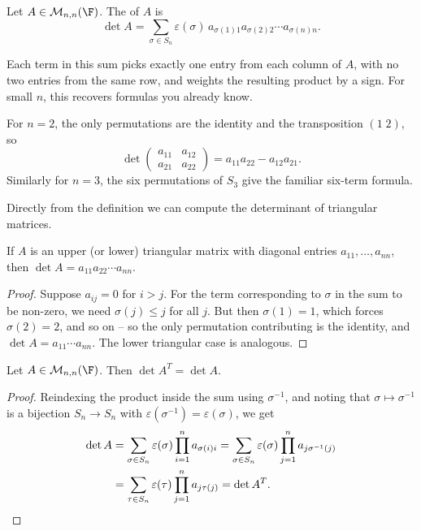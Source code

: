 \begin{definition}[Determinant]
    Let $A \in \mathcal{M}_{n,n}(\F)$. The  of $A$ is
    $$
    \det A = \sum_{\sigma \in S_n} \varepsilon(\sigma)\, a_{\sigma(1) 1} a_{\sigma(2) 2} \cdots a_{\sigma(n) n}.
    $$
\end{definition}

Each term in this sum picks exactly one entry from each column of $A$, with no two entries from the same row, and weights the resulting product by a sign. For small $n$, this recovers formulas you already know.

\begin{example}
    For $n = 2$, the only permutations are the identity and the transposition $(1\;2)$, so
    $$
    \det \begin{pmatrix}
        a_{11} & a_{12} \\ a_{21} & a_{22}
    \end{pmatrix} = a_{11}a_{22} - a_{12}a_{21}.
    $$
    Similarly for $n = 3$, the six permutations of $S_3$ give the familiar six-term formula.
\end{example}

Directly from the definition we can compute the determinant of triangular matrices.

\begin{lemma}
    If $A$ is an upper (or lower) triangular matrix with diagonal entries $a_{11}, \dots, a_{nn}$, then $\det A = a_{11} a_{22} \cdots a_{nn}$.
\end{lemma}
\begin{proof}
    Suppose $a_{ij} = 0$ for $i > j$. For the term corresponding to $\sigma$ in the sum to be non-zero, we need $\sigma(j) \leq j$ for all $j$. But then $\sigma(1) = 1$, which forces $\sigma(2) = 2$, and so on -- so the only permutation contributing is the identity, and $\det A = a_{11} \cdots a_{nn}$. The lower triangular case is analogous.
\end{proof}

\begin{lemma}
    Let $A \in \mathcal{M}_{n,n}(\F)$. Then $\det A^T = \det A$.
\end{lemma}
\begin{proof}
    Reindexing the product inside the sum using $\sigma^{-1}$, and noting that $\sigma \mapsto \sigma^{-1}$ is a bijection $S_n \rightarrow S_n$ with $\varepsilon(\sigma^{-1}) = \varepsilon(\sigma)$, we get
    \begin{align*}
    \det A &= \sum_{\sigma \in S_n} \varepsilon(\sigma) \prod_{i = 1}^n a_{\sigma(i) i} = \sum_{\sigma \in S_n} \varepsilon(\sigma) \prod_{j = 1}^n a_{j \sigma^{-1}(j)} \\
    &= \sum_{\tau \in S_n} \varepsilon(\tau) \prod_{j = 1}^n a_{j \tau(j)} = \det A^T. \qedhere
    \end{align*}
\end{proof}

